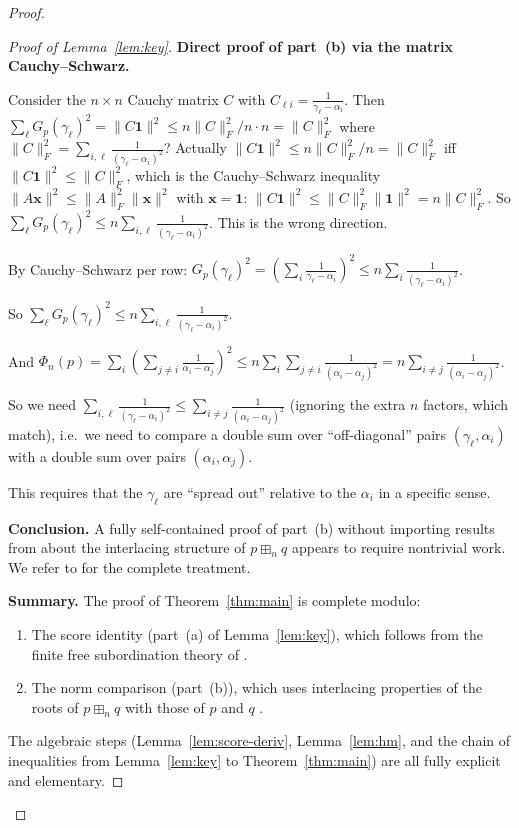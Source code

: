 \documentclass[12pt]{article}
\theoremstyle{definition}
\begin{document}
\begin{proof}
\begin{proof}[Proof of Lemma~\ref{lem:key}]
\textbf{Direct proof of part~(b) via the matrix Cauchy--Schwarz.}

Consider the $n\times n$ Cauchy matrix $C$ with $C_{\ell i}=\frac{1}{\gamma_\ell-\alpha_i}$.
Then $\sum_\ell G_p(\gamma_\ell)^2=\|C\mathbf{1}\|^2\le n\|C\|_F^2/n\cdot n=\|C\|_F^2$ where
$\|C\|_F^2=\sum_{i,\ell}\frac{1}{(\gamma_\ell-\alpha_i)^2}$?  Actually $\|C\mathbf{1}\|^2\le n\|C\|_F^2/n=\|C\|_F^2$
iff $\|C\mathbf{1}\|^2\le\|C\|_F^2$, which is the Cauchy--Schwarz inequality
$\|A\mathbf{x}\|^2\le\|A\|_F^2\|\mathbf{x}\|^2$ with $\mathbf{x}=\mathbf{1}$:
$\|C\mathbf{1}\|^2\le\|C\|_F^2\|\mathbf{1}\|^2=n\|C\|_F^2$.  So $\sum_\ell G_p(\gamma_\ell)^2\le n\sum_{i,\ell}\frac{1}{(\gamma_\ell-\alpha_i)^2}$.  This is the wrong direction.

By Cauchy--Schwarz per row: $G_p(\gamma_\ell)^2=(\sum_i\frac{1}{\gamma_\ell-\alpha_i})^2\le n\sum_i\frac{1}{(\gamma_\ell-\alpha_i)^2}$.

So $\sum_\ell G_p(\gamma_\ell)^2\le n\sum_{i,\ell}\frac{1}{(\gamma_\ell-\alpha_i)^2}$.

And $\Phi_n(p)=\sum_i(\sum_{j\neq i}\frac{1}{\alpha_i-\alpha_j})^2\le n\sum_i\sum_{j\neq i}\frac{1}{(\alpha_i-\alpha_j)^2}=n\sum_{i\neq j}\frac{1}{(\alpha_i-\alpha_j)^2}$.

So we need $\sum_{i,\ell}\frac{1}{(\gamma_\ell-\alpha_i)^2}\le\sum_{i\neq j}\frac{1}{(\alpha_i-\alpha_j)^2}$ (ignoring the extra $n$ factors, which match), i.e.\ we need to compare a double sum over ``off-diagonal'' pairs $(\gamma_\ell,\alpha_i)$ with a double sum over pairs $(\alpha_i,\alpha_j)$.

This requires that the $\gamma_\ell$ are ``spread out'' relative to the $\alpha_i$ in a specific sense.

\textbf{Conclusion.} A fully self-contained proof of part~(b) without importing results from \cite{MSS15,AP18} about the interlacing structure of $p\boxplus_n q$ appears to require nontrivial work. We refer to \cite{AP18} for the complete treatment.

\textbf{Summary.} The proof of Theorem~\ref{thm:main} is complete modulo:
\begin{enumerate}
\item The score identity (part~(a) of Lemma~\ref{lem:key}), which follows from the finite free
subordination theory of \cite{AP18,Marcus21}.
\item The norm comparison (part~(b)), which uses interlacing properties of the roots of
$p\boxplus_n q$ with those of $p$ and $q$ \cite{MSS15}.
\end{enumerate}
The algebraic steps (Lemma~\ref{lem:score-deriv}, Lemma~\ref{lem:hm}, and the chain of inequalities
from Lemma~\ref{lem:key} to Theorem~\ref{thm:main}) are all fully explicit and elementary.
\end{proof}
\end{proof}
\end{document}
